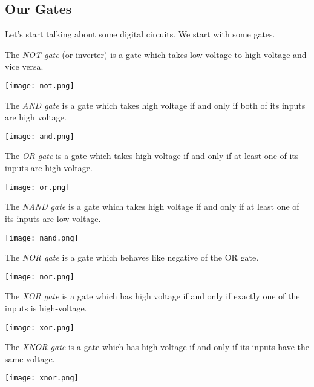 \subsection{Our Gates}
Let's start talking about some digital circuits. We start with some gates.
\begin{definition}
	The \textit{NOT gate} (or inverter) is a gate which takes low voltage to high voltage and vice versa.
	\begin{center}
		\texttt{[image: not.png]}
	\end{center}
\end{definition}
\begin{definition}
	The \textit{AND gate} is a gate which takes high voltage if and only if both of its inputs are high voltage.
	\begin{center}
		\texttt{[image: and.png]}
	\end{center}
\end{definition}
\begin{definition}[OR gate]
	The \textit{OR gate} is a gate which takes high voltage if and only if at least one of its inputs are high voltage.
	\begin{center}
		\texttt{[image: or.png]}
	\end{center}
\end{definition}
\begin{definition}
	The \textit{NAND gate} is a gate which takes high voltage if and only if at least one of its inputs are low voltage.
	\begin{center}
		\texttt{[image: nand.png]}
	\end{center}
\end{definition}
\begin{definition}
	The \textit{NOR gate} is a gate which behaves like negative of the OR gate.
	\begin{center}
		\texttt{[image: nor.png]}
	\end{center}
\end{definition}
\begin{definition}
	The \textit{XOR gate} is a gate which has high voltage if and only if exactly one of the inputs is high-voltage.
	\begin{center}
		\texttt{[image: xor.png]}
	\end{center}
\end{definition}
\begin{definition}
	The \textit{XNOR gate} is a gate which has high voltage if and only if its inputs have the same voltage.
	\begin{center}
		\texttt{[image: xnor.png]}
	\end{center}
\end{definition}


